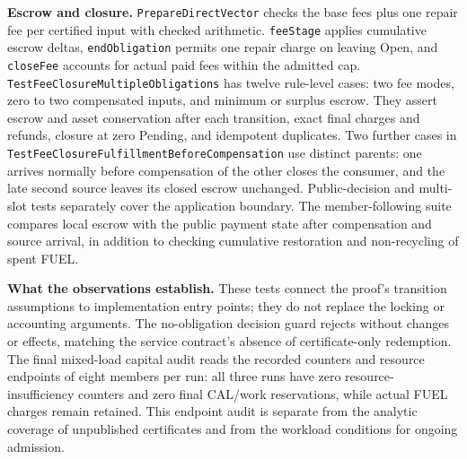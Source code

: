 \noindent\textbf{Escrow and closure.}
\texttt{PrepareDirectVector} checks the base fees plus one repair fee per
certified input with checked arithmetic. \texttt{feeStage} applies cumulative
escrow deltas, \texttt{endObligation} permits one repair charge on leaving
Open, and \texttt{closeFee} accounts for actual paid fees within the admitted
cap. \texttt{Test\allowbreak Fee\allowbreak Closure\allowbreak Multiple\allowbreak Obligations} has twelve rule-level cases:
two fee modes, zero to two compensated inputs, and minimum or surplus escrow.
They assert escrow and asset conservation after each transition, exact final
charges and refunds, closure at zero Pending, and idempotent duplicates.
Two further cases in \texttt{Test\allowbreak Fee\allowbreak Closure\allowbreak Fulfillment\allowbreak Before\allowbreak Compensation}
use distinct parents: one arrives normally before compensation of the other
closes the consumer, and the late second source leaves its closed escrow
unchanged. Public-decision and multi-slot tests separately cover the
application boundary. The member-following suite compares local escrow with
the public payment state after compensation and source arrival, in addition
to checking cumulative restoration and non-recycling of spent FUEL.

\noindent\textbf{What the observations establish.}
These tests connect the proof's transition assumptions to implementation
entry points; they do not replace the locking or accounting arguments.
The no-obligation decision guard rejects without changes or effects, matching
the service contract's absence of certificate-only redemption. The final
mixed-load capital audit reads the recorded counters and resource endpoints
of eight members per run: all three runs have zero resource-insufficiency
counters and zero final CAL/work reservations, while actual FUEL charges
remain retained. This endpoint audit is separate from the analytic coverage
of unpublished certificates and from the workload conditions for ongoing
admission.
